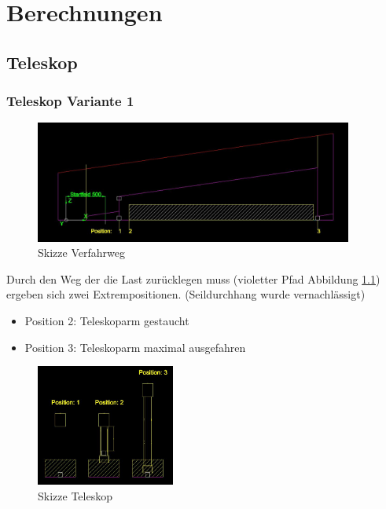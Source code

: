 \documentclass[a4paper]{report}
\begin{document}
\chapter{Berechnungen}
\label{app:ch:Berechnung}
\section{Teleskop}
\label{app:sec:Teleskjope}
\subsection{Teleskop Variante 1}
\label{app:ssec:TeleskopjeVar1}
\begin{figure}[h]
	\centering
	\includegraphics[keepaspectratio,height=4cm]{Teleskoparm1.JPG}
	\caption{Skizze Verfahrweg}
	\label{fig:Skizze Verfahrweg}
\end{figure}

Durch den Weg der die Last zurücklegen muss (violetter Pfad Abbildung \ref{fig:Skizze Verfahrweg}) ergeben sich zwei Extrempositionen.
(Seildurchhang wurde vernachlässigt)


\begin{itemize}[noitemsep]
	\item Position 2: Teleskoparm gestaucht
	\item Position 3: Teleskoparm maximal ausgefahren
\end{itemize}


\begin{figure}[h]
	\centering
	\includegraphics[keepaspectratio,height=4cm]{Teleskoparm2.JPG}
	\caption{Skizze Teleskop}
	\label{fig:Teleskoparm}
\end{figure}
\end{document}
